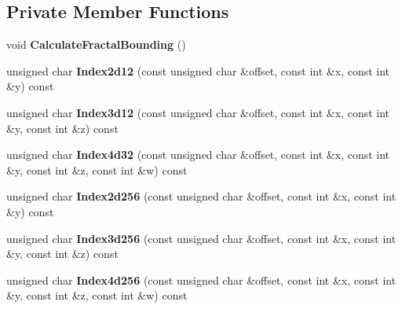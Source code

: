 \subsection*{Private Member Functions}
\begin{DoxyCompactItemize}
\item 
\mbox{\label{class_flounder_1_1_noise_fast_af08c030014ea4cc82920270e977e3502}} 
void {\bfseries Calculate\+Fractal\+Bounding} ()
\item 
\mbox{\label{class_flounder_1_1_noise_fast_a7e85dfc2532c7d2e08848c15ea0ae932}} 
unsigned char {\bfseries Index2d12} (const unsigned char \&offset, const int \&x, const int \&y) const
\item 
\mbox{\label{class_flounder_1_1_noise_fast_a95609d8b08fee09ce028cdc460eb5a62}} 
unsigned char {\bfseries Index3d12} (const unsigned char \&offset, const int \&x, const int \&y, const int \&z) const
\item 
\mbox{\label{class_flounder_1_1_noise_fast_a2a39b75cfe2159b39faaa5f688371a6b}} 
unsigned char {\bfseries Index4d32} (const unsigned char \&offset, const int \&x, const int \&y, const int \&z, const int \&w) const
\item 
\mbox{\label{class_flounder_1_1_noise_fast_a0bd822e9b165551405441d800bcb8822}} 
unsigned char {\bfseries Index2d256} (const unsigned char \&offset, const int \&x, const int \&y) const
\item 
\mbox{\label{class_flounder_1_1_noise_fast_aefbd34795a2c0e249bca1c7b1ff3f247}} 
unsigned char {\bfseries Index3d256} (const unsigned char \&offset, const int \&x, const int \&y, const int \&z) const
\item 
\mbox{\label{class_flounder_1_1_noise_fast_a56a914d160b90f55375c190c306c00ff}} 
unsigned char {\bfseries Index4d256} (const unsigned char \&offset, const int \&x, const int \&y, const int \&z, const int \&w) const
\item 
\mbox{\label{class_flounder_1_1_noise_fast_a5f4b03f52a87467f0c1240076047c778}} 

\end{DoxyCompactItemize}
